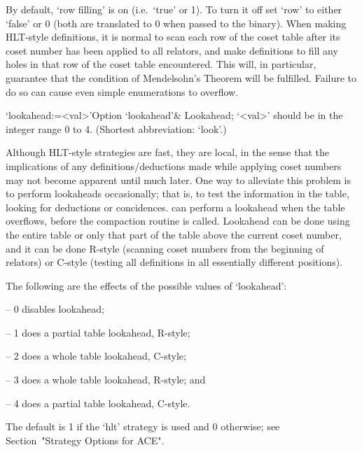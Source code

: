 By default, \lq{}row filling' is on (i.e.~`true' or 1). To turn it off
set `row' to either `false' or 0 (both are translated to 0 when passed
to  the {\ACE}  binary).   When making  HLT-style  definitions, it  is
normal to scan each row of  the coset table after its coset number has
been applied to  all relators, and make definitions  to fill any holes
in that row of the  coset table encountered. This will, in particular,
guarantee  that   the  condition  of  Mendelsohn's   Theorem  will  be
fulfilled.  Failure  to do  so can cause  even simple  enumerations to
overflow.

\>`lookahead:=<val>'{Option `lookahead'}&
Lookahead; `<val>' should be in the integer range 0 to 4.
(Shortest abbreviation: `look'.)
  
Although HLT-style strategies are fast, they are local, in  the  sense
that  the  implications  of  any  definitions/deductions  made   while
applying coset numbers may not become apparent until much  later.  One
way to alleviate this problem is to perform  lookaheads  occasionally;
that is, to test the information in the table, looking for  deductions
or  concidences.  {\ACE}  can  perform  a  lookahead  when  the  table
overflows, before the compaction routine is called. Lookahead  can  be
done using the entire table or only that part of the table  above  the
current coset number, and it  can  be  done  R-style  (scanning  coset
numbers from the  beginning  of  relators)  or  C-style  (testing  all
definitions in all essentially different positions).

The following are the effects of the possible values of `lookahead':

\beginlist

\item{--} 0 disables lookahead;
\item{--} 1 does a partial table lookahead, R-style; 
\item{--} 2 does a whole table lookahead, C-style; 
\item{--} 3 does a whole table lookahead, R-style; and
\item{--} 4 does a partial table lookahead, C-style.  

\endlist

The default is 1 if the `hlt' strategy is used and  0  otherwise;  see
Section~"Strategy Options for ACE".


